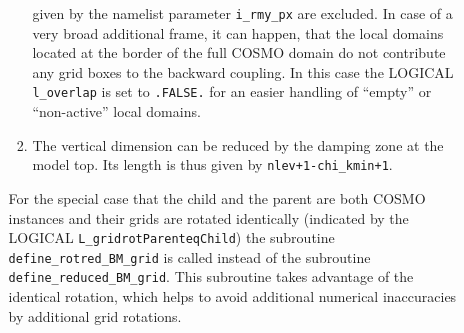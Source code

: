 \documentclass[11pt,twoside]{article}
\begin{document}
\begin{enumerate}
\begin{itemize}
\begin{enumerate}
given by the namelist parameter \verb|i_rmy_px| are excluded. In case of a 
very broad additional frame, it can happen, that the local domains located at
the border of the full COSMO domain do not contribute any grid boxes 
to the backward coupling.  In this case the {\footnotesize LOGICAL
}\verb|l_overlap| is 
set to \verb|.FALSE.| for an easier handling of  ``empty'' or ``non-active''
local domains. 
\item  The vertical
dimension can be reduced by the damping zone at the model top. Its length 
is thus given by \verb|nlev+1-chi_kmin+1|.
\end{enumerate}
For the special case that the child and the parent are both COSMO instances
and their grids are rotated identically (indicated by the {\footnotesize LOGICAL }
\verb|L_gridrotParenteqChild|) the subroutine \verb|define_rotred_BM_grid| is
called instead of the subroutine \verb|define_reduced_BM_grid|.
This subroutine takes advantage of the identical rotation, which helps  
to avoid additional numerical inaccuracies by additional grid rotations.


\end{itemize}
\end{enumerate}
\end{document}
